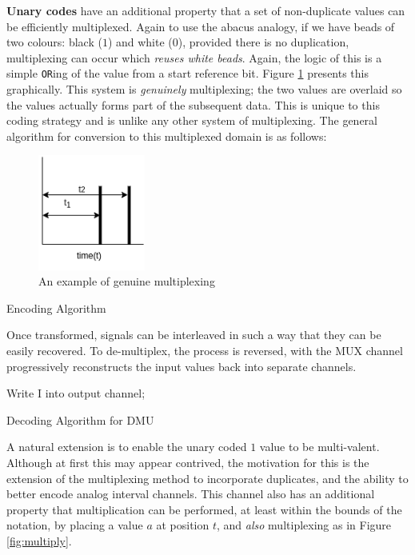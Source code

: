 \documentclass{article}
\begin{document}
\textbf{Unary codes} have an additional property that a set of non-duplicate values can be efficiently multiplexed. Again to use the abacus analogy, if we have beads of two colours: black ($1$) and white ($0$), provided there is no duplication, multiplexing can occur which \textit{reuses white beads}. Again, the logic of this is a simple \texttt{OR}ing of the value from a start reference bit. Figure \ref{fig:mul1} presents this graphically. This system is \emph{genuinely} multiplexing; the two values are overlaid so the values actually forms part of the subsequent data. This is unique to this coding strategy and is unlike any other system of multiplexing. The general algorithm for conversion to this multiplexed domain is as follows:


\begin{figure}
	\centerline{\includegraphics[width=100pt]{figures/multiplex.png}}
	\caption{An example of genuine multiplexing}\label{fig:mul1}
\end{figure}

\begin{algorithm}
	\SetAlgoLined %
	\caption{Encoding Algorithm}
\end{algorithm}

Once transformed, signals can be interleaved in such a way that they can be easily recovered. To de-multiplex, the process is reversed, with the MUX channel progressively reconstructs the input values back into separate channels.

\begin{algorithm}
	\SetAlgoLined %
	 {
		 {
				Write I into output channel;
			}
	}
	\caption{Decoding Algorithm for DMU}
\end{algorithm}


A natural extension is to enable the unary coded $1$ value to be multi-valent. Although at first this may appear contrived, the motivation for this is the extension of the multiplexing method to incorporate duplicates, and the ability to better encode analog interval channels. This channel also has an additional property that multiplication can be performed, at least within the bounds of the notation, by placing a value $a$ at position $t$, and \textit{also} multiplexing as in Figure \ref{fig:multiply}.
\end{document}
